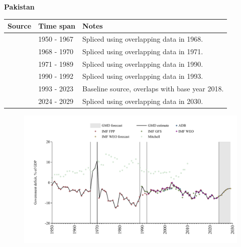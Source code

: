 \documentclass[12pt,a4paper,landscape]{article}
\begin{document}
\begin{adjustbox}{max totalsize={\paperwidth}{\paperheight},center}
\begin{minipage}[t][\textheight][t]{\textwidth}
\vspace*{0.5cm}
{}
\begin{center}
{\Large\bfseries Pakistan}
\end{center}
\vspace{0.5cm}
\begin{table}[H]
\centering
\small
\begin{tabular}{|l|l|l|}
\hline
\textbf{Source} & \textbf{Time span} & \textbf{Notes} \\
\hline
\rowcolor{white}\cite{IMF_FPP}& 1950 - 1967 &Spliced using overlapping data in 1968.\\
\rowcolor{lightgray}\cite{Mitchell}& 1968 - 1970 &Spliced using overlapping data in 1971.\\
\rowcolor{white}\cite{IMF_FPP}& 1971 - 1989 &Spliced using overlapping data in 1990.\\
\rowcolor{lightgray}\cite{IMF_GFS}& 1990 - 1992 &Spliced using overlapping data in 1993.\\
\rowcolor{white}\cite{IMF_WEO}& 1993 - 2023 &Baseline source, overlaps with base year 2018.\\
\rowcolor{lightgray}\cite{IMF_WEO_forecast}& 2024 - 2029 &Spliced using overlapping data in 2030.\\
\hline
\end{tabular}
\end{table}
\begin{figure}[H]
\centering
\includegraphics[width=\textwidth,height=0.6\textheight,keepaspectratio]{graphs/PAK_govdef_GDP.pdf}
\end{figure}
\end{minipage}
\end{adjustbox}
\end{document}

